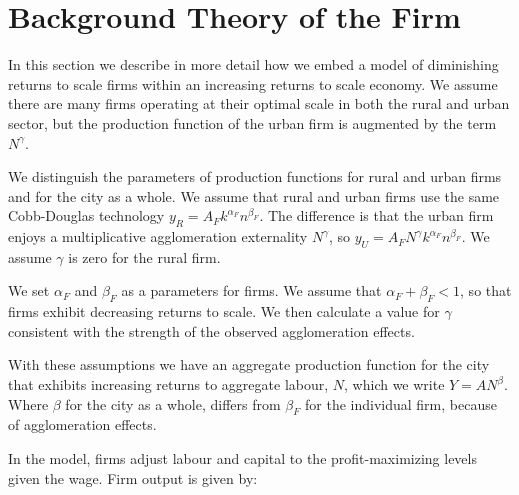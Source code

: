 \chapter{Background Theory of the Firm} \label{appendix-firm-theory}

{\color{red}


}

In this section we describe in more detail how we embed a model of diminishing returns to scale firms within an increasing returns to scale economy. We assume there are many firms operating at their optimal scale in both the rural and urban sector, but the production function of the urban firm is augmented by the term $N^\gamma$. 


We distinguish the parameters of production functions for rural and urban firms and for the city as a whole. We assume that rural and urban firms use the same Cobb-Douglas technology ${y_R}=A_Fk^{\alpha_F}n^{\beta_F}$. The difference is that the urban firm enjoys a multiplicative agglomeration externality $N^\gamma$, so ${y_U}=A_FN^\gamma  k^{\alpha_F}n^{\beta_F}$. We assume $\gamma$ is zero for the rural firm. 

We set $\alpha_F$ and $\beta_F$ as a parameters for firms. We assume that $\alpha_F+\beta_F<1$, so that firms exhibit decreasing returns to scale.  We then calculate a value for $\gamma$ consistent with the strength of the observed agglomeration effects. 

With these assumptions we have an aggregate production function for the city that exhibits increasing returns to aggregate labour, $N$,  which we write $Y=AN^\beta$. Where $\beta$ for the city as a whole, differs from $\beta_F$ for the individual firm, because of agglomeration effects. 

In the model, firms adjust labour and capital to the profit-maximizing levels given the wage. %
Firm output is given by:

